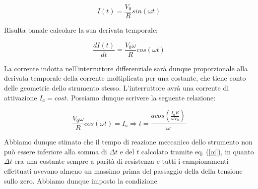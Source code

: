 \begin{equation}
I(t)=\frac{V_0}{R}sin(\omega t)
\label{corrente}
\end{equation}

Risulta banale calcolare la sua derivata temporale:

\begin{equation}
\frac{dI(t)}{dt}=\frac{V_0 \omega}{R}cos(\omega t)
\end{equation}

La corrente indotta nell'interruttore differenziale sarà dunque proporzionale alla derivata temporale della corrente moltiplicata per una costante, che tiene conto delle geometrie dello strumento stesso. L'interruttore avrà una corrente di attivazione $I_a=cost$. Possiamo dunque scrivere la seguente relazione:

\begin{equation}
\frac{V_0 \omega}{R}cos(\omega t)=I_a \Rightarrow t=\frac{acos(\frac{I_a R}{\omega V_0})}{\omega }
\label{oi}
\end{equation} 

Abbiamo dunque stimato che il tempo di reazione meccanico dello strumento non può essere inferiore alla somma di $\Delta t$ e del $t$ calcolato tramite eq. (\ref{oi}), in quanto $\Delta t$ era una costante sempre a parità di resistenza e tutti i campionamenti effettuati avevano almeno un massimo prima del passaggio della della tensione sullo zero. Abbiamo dunque imposto la condizione 
